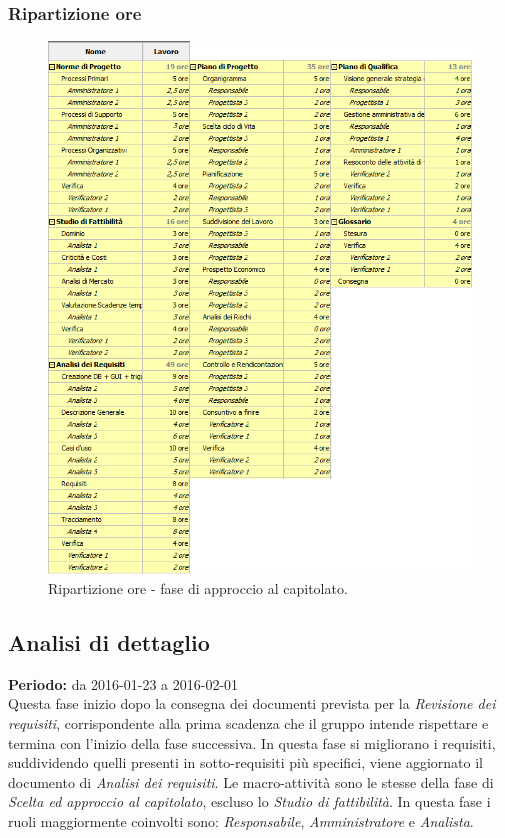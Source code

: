 \documentclass[a4paper]{article}
\begin{document}
			\subsubsection{Ripartizione ore}
				\begin{figure}[H]
					\centering
					\includegraphics[width=\textwidth]{ro_approccio}
					\caption{Ripartizione ore - fase di approccio al capitolato.}
				\end{figure}

		\subsection{Analisi di dettaglio}
			\textbf{Periodo:} da 2016-01-23 a 2016-02-01 \\
			Questa fase inizio dopo la consegna dei documenti prevista per la \emph{Revisione dei requisiti}, corrispondente alla prima scadenza 
			che il gruppo intende rispettare e termina con l'inizio della fase successiva. In questa fase si migliorano i requisiti, suddividendo 
			quelli presenti in sotto-requisiti più specifici, viene aggiornato il documento di \emph{Analisi dei requisiti}.
			Le macro-attività sono le stesse della fase di \emph{Scelta ed approccio al capitolato}, escluso lo \emph{Studio di fattibilità}. 
			In questa fase i ruoli maggiormente coinvolti sono: \emph{Responsabile}, \emph{Amministratore} e \emph{Analista}.
\end{document}
